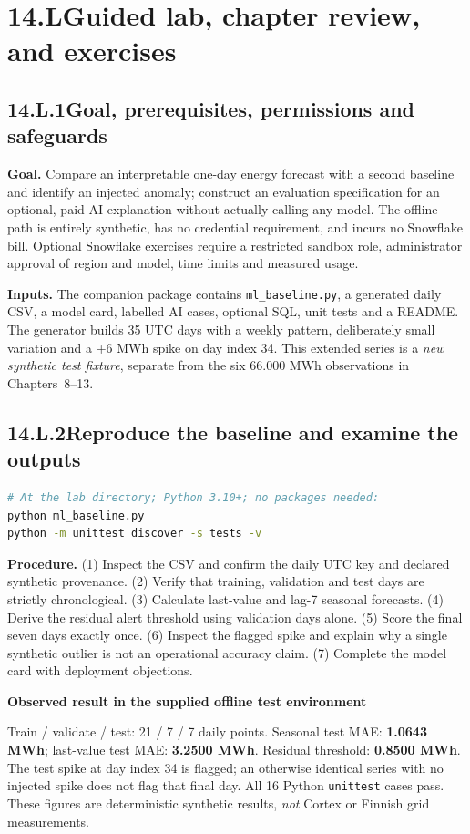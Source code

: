 \documentclass[11pt,twoside]{article}
\newcommand{\topic}[2]{\subsection*{#1\quad #2}}
\begin{document}
\newpage

\section*{14.L\quad Guided lab, chapter review, and exercises}
\topic{14.L.1}{Goal, prerequisites, permissions and safeguards}
\textbf{Goal.} Compare an interpretable one-day energy forecast with a second baseline and identify an injected anomaly; construct an evaluation specification for an optional, paid AI explanation without actually calling any model. The offline path is entirely synthetic, has no credential requirement, and incurs no Snowflake bill. Optional Snowflake exercises require a restricted sandbox role, administrator approval of region and model, time limits and measured usage.

\textbf{Inputs.} The companion package contains \texttt{ml\_baseline.py}, a generated daily CSV, a model card, labelled AI cases, optional SQL, unit tests and a README. The generator builds 35 UTC days with a weekly pattern, deliberately small variation and a +6 MWh spike on day index 34. This extended series is a \emph{new synthetic test fixture}, separate from the six 66.000 MWh observations in Chapters~8--13.
\topic{14.L.2}{Reproduce the baseline and examine the outputs}
\begin{lstlisting}[language=bash]
# At the lab directory; Python 3.10+; no packages needed:
python ml_baseline.py
python -m unittest discover -s tests -v
\end{lstlisting}
\textbf{Procedure.} (1) Inspect the CSV and confirm the daily UTC key and declared synthetic provenance. (2) Verify that training, validation and test days are strictly chronological. (3) Calculate last-value and lag-7 seasonal forecasts. (4) Derive the residual alert threshold using validation days alone. (5) Score the final seven days exactly once. (6) Inspect the flagged spike and explain why a single synthetic outlier is not an operational accuracy claim. (7) Complete the model card with deployment objections.
\begin{whitebox}\textbf{Observed result in the supplied offline test environment}\par
Train / validate / test: 21 / 7 / 7 daily points. Seasonal test MAE: \textbf{1.0643 MWh}; last-value test MAE: \textbf{3.2500 MWh}. Residual threshold: \textbf{0.8500 MWh}. The test spike at day index 34 is flagged; an otherwise identical series with no injected spike does not flag that final day. All 16 Python \texttt{unittest} cases pass. These figures are deterministic synthetic results, \emph{not} Cortex or Finnish grid measurements.
\end{whitebox}
\end{document}
